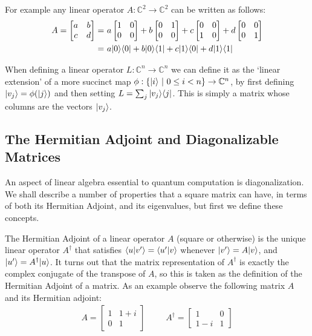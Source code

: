 For example any linear operator $A: \mathbb{C}^2 \to \mathbb{C}^2$ can be written as follows:
\begin{align*}
	A = \left[\begin{matrix}
		a&b\\
		c&d
	\end{matrix}\right]
	=&\ 
	a\left[\begin{matrix}
		1&0\\
		0&0
	\end{matrix}\right]
	+
	b\left[\begin{matrix}
		0&1\\
		0&0
	\end{matrix}\right]
	+
	c\left[\begin{matrix}
		0&0\\
		1&0
	\end{matrix}\right]
	+
	d\left[\begin{matrix}
		0&0\\
		0&1
	\end{matrix}\right]
	\\=&\  a\ket{0}\bra{0}+b\ket{0}\bra{1}+c\ket{1}\bra{0}+d\ket{1}\bra{1}
\end{align*}

When defining a linear operator $L: \mathbb{C}^n \to \mathbb{C}^n$ we can define it as the `linear extension' of a more succinct map $\phi: \{| i \rangle\ |\ 0 \leq i < n\} \to \mathbb{C}^n$, by first defining $| v_j \rangle = \phi(| j \rangle)$ and then setting $L = \sum_{j} | v_j \rangle\langle j |$. This is simply a matrix whose columns are the vectors $| v_j \rangle$.
\subsection{The Hermitian Adjoint and Diagonalizable Matrices}
An aspect of linear algebra essential to quantum computation is diagonalization. We shall describe a number of properties that a square matrix can have, in terms of both its Hermitian Adjoint, and its eigenvalues, but first we define these concepts.

The Hermitian Adjoint of a linear operator $A$ (square or otherwise) is the unique linear operator $A^\dagger$ that satisfies $\langle u | v' \rangle = \langle u' | v \rangle$ whenever $| v' \rangle = A| v \rangle$, and $| u' \rangle = A^\dagger | u \rangle$. It turns out that the matrix representation of $A^\dagger$ is exactly the complex conjugate of the transpose of $A$, so this is taken as the definition of the Hermitian Adjoint of a matrix. As an example observe the following matrix $A$ and its Hermitian adjoint:
\begin{align*}
	A = \left[\begin{matrix}
		1 & 1+i\\
		0 & 1
	\end{matrix}\right]
	&&&
	A^\dagger = \left[\begin{matrix}
		1 & 0\\
		1-i & 1
	\end{matrix}\right]
\end{align*}

